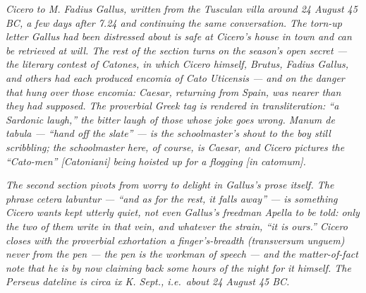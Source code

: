 
\textit{Cicero to M. Fadius Gallus, written from the Tusculan villa
around 24 August 45 BC, a few days after 7.24 and continuing the
same conversation. The torn-up letter Gallus had been distressed
about is safe at Cicero's house in town and can be retrieved at
will. The rest of the section turns on the season's open
secret --- the literary contest of \textit{Catones}, in which
Cicero himself, Brutus, Fadius Gallus, and others had each produced
encomia of Cato Uticensis --- and on the danger that hung over those
encomia: Caesar, returning from Spain, was nearer than they had
supposed. The proverbial Greek tag is rendered in transliteration:
``a Sardonic laugh,'' the bitter laugh of those whose joke goes
wrong. \textit{Manum de tabula} --- ``hand off the slate'' ---
is the schoolmaster's shout to the boy still scribbling; the
schoolmaster here, of course, is Caesar, and Cicero pictures the
``Cato-men'' \textit{[Catoniani]} being hoisted up for a flogging
\textit{[in catomum]}.}

\textit{The second section pivots from worry to delight in
Gallus's prose itself. The phrase \textit{cetera labuntur} ---
``and as for the rest, it falls away'' --- is something Cicero
wants kept utterly quiet, not even Gallus's freedman Apella to be
told: only the two of them write in that vein, and whatever the
strain, ``it is ours.'' Cicero closes with the proverbial
exhortation a finger's-breadth (\textit{transversum unguem}) never
from the pen --- \textit{the pen is the workman of speech} --- and
the matter-of-fact note that he is by now claiming back some hours
of the night for it himself. The Perseus dateline is \textit{circa
ix K. Sept.}, i.e.\ about 24 August 45 BC.}
